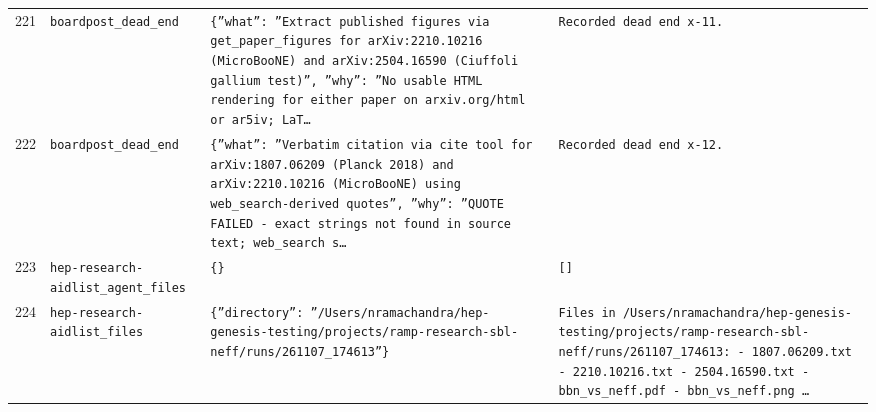 \documentclass[11pt,a4paper]{article}
\begin{document}
\begin{longtable}{@{}p{}p{}p{}p{}@{}}
221 & \texttt{board}\newline\texttt{post\_\allowbreak{}dead\_\allowbreak{}end} & \texttt{\{''what'':\allowbreak{} ''Extract published figures via get\_\allowbreak{}paper\_\allowbreak{}figures for arXiv:\allowbreak{}2210.10216 (MicroBooNE)\allowbreak{} and arXiv:\allowbreak{}2504.16590 (Ciuffoli gallium test)\allowbreak{}'',\allowbreak{} ''why'':\allowbreak{} ''No usable HTML rendering for either paper on arxiv.org/\allowbreak{}html or ar5iv;\allowbreak{} LaT\ldots{}\allowbreak{}} & \texttt{Recorded dead end x-11.} \\
222 & \texttt{board}\newline\texttt{post\_\allowbreak{}dead\_\allowbreak{}end} & \texttt{\{''what'':\allowbreak{} ''Verbatim citation via cite tool for arXiv:\allowbreak{}1807.06209 (Planck 2018)\allowbreak{} and arXiv:\allowbreak{}2210.10216 (MicroBooNE)\allowbreak{} using web\_\allowbreak{}search-derived quotes'',\allowbreak{} ''why'':\allowbreak{} ''QUOTE FAILED - exact strings not found in source text;\allowbreak{} web\_\allowbreak{}search s\ldots{}\allowbreak{}} & \texttt{Recorded dead end x-12.} \\
223 & \texttt{hep-research-aid}\newline\texttt{list\_\allowbreak{}agent\_\allowbreak{}files} & \texttt{\{\}\allowbreak{}} & \texttt{[]\allowbreak{}} \\
224 & \texttt{hep-research-aid}\newline\texttt{list\_\allowbreak{}files} & \texttt{\{''directory'':\allowbreak{} ''/\allowbreak{}Users/\allowbreak{}nramachandra/\allowbreak{}hep-genesis-testing/\allowbreak{}projects/\allowbreak{}ramp-research-sbl-neff/\allowbreak{}runs/\allowbreak{}261107\_\allowbreak{}174613''\}\allowbreak{}} & \texttt{Files in /\allowbreak{}Users/\allowbreak{}nramachandra/\allowbreak{}hep-genesis-testing/\allowbreak{}projects/\allowbreak{}ramp-research-sbl-neff/\allowbreak{}runs/\allowbreak{}261107\_\allowbreak{}174613:\allowbreak{}   - 1807.06209.txt   - 2210.10216.txt   - 2504.16590.txt   - bbn\_\allowbreak{}vs\_\allowbreak{}neff.pdf   - bbn\_\allowbreak{}vs\_\allowbreak{}neff.png   \ldots{}\allowbreak{}} \\

\end{longtable}
\end{document}

